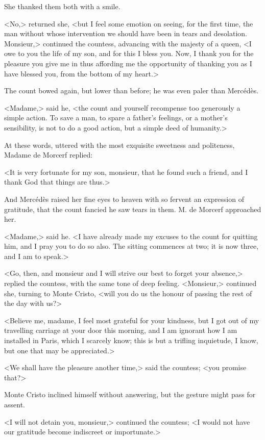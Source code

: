  She thanked them both with a smile. 

 <No,> returned she, <but I feel some emotion on seeing, for the first time, the man without whose intervention we should have been in tears and desolation. Monsieur,> continued the countess, advancing with the majesty of a queen, <I owe to you the life of my son, and for this I bless you. Now, I thank you for the pleasure you give me in thus affording me the opportunity of thanking you as I have blessed you, from the bottom of my heart.> 

 The count bowed again, but lower than before; he was even paler than Mercédès. 

 <Madame,> said he, <the count and yourself recompense too generously a simple action. To save a man, to spare a father's feelings, or a mother's sensibility, is not to do a good action, but a simple deed of humanity.> 

 At these words, uttered with the most exquisite sweetness and politeness, Madame de Morcerf replied: 

 <It is very fortunate for my son, monsieur, that he found such a friend, and I thank God that things are thus.> 

 And Mercédès raised her fine eyes to heaven with so fervent an expression of gratitude, that the count fancied he saw tears in them. M. de Morcerf approached her. 

 <Madame,> said he. <I have already made my excuses to the count for quitting him, and I pray you to do so also. The sitting commences at two; it is now three, and I am to speak.> 

 <Go, then, and monsieur and I will strive our best to forget your absence,> replied the countess, with the same tone of deep feeling. <Monsieur,> continued she, turning to Monte Cristo, <will you do us the honour of passing the rest of the day with us?> 

 <Believe me, madame, I feel most grateful for your kindness, but I got out of my travelling carriage at your door this morning, and I am ignorant how I am installed in Paris, which I scarcely know; this is but a trifling inquietude, I know, but one that may be appreciated.> 

 <We shall have the pleasure another time,> said the countess; <you promise that?> 

 Monte Cristo inclined himself without answering, but the gesture might pass for assent. 

 <I will not detain you, monsieur,> continued the countess; <I would not have our gratitude become indiscreet or importunate.> 

